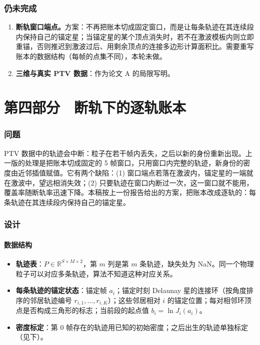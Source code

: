 \section{仍未完成}\label{pC:sec:rest}
\begin{enumerate}
\item \textbf{断轨窗口端点。}方案：不再把账本切成固定窗口，而是让每条轨迹在其连续段内保持自己的锚定星；当锚定星的某个顶点消失时，若不在激波模板内则立即重锚，否则推迟到激波过后、用剩余顶点的连接多边形计算面积比。需要重写账本的数据结构（每帧的点集不同），本轮未做。
\item \textbf{三维与真实 PTV 数据}：作为论文 A 的局限写明。
\end{enumerate}

\clearpage\part{第四部分　断轨下的逐轨账本}

\noindent{}



\section{问题}
PTV 数据中的轨迹会中断：粒子在若干帧内丢失，之后以新的身份重新出现。上一版的处理是把账本切成固定的 5 帧窗口，只用窗口内完整的轨迹，新身份的密度由近邻插值赋值。它有两个缺陷：(1) 窗口端点若落在激波内，锚定星的一端就在激波中，望远相消失效；(2) 只要轨迹在窗口内断过一次，这一窗口就不能用，覆盖率随断轨率迅速下降。本稿按上一份报告给出的方案，把账本改成逐轨的：每条轨迹在其连续段内保持自己的锚定星。

\section{设计}
\subsection{数据结构}
\begin{itemize}
\item \textbf{轨迹表}：$P\in\mathbb R^{S\times M\times2}$，第 $m$ 列是第 $m$ 条轨迹，缺失处为 NaN。同一个物理粒子可以对应多条轨迹，算法不知道这种对应关系。
\item \textbf{每条轨迹的锚定状态}：锚定帧 $a_i$；锚定时刻 Delaunay 星的连接环（按角度排序的邻居轨迹编号 $r_{i,1},\dots,r_{i,K}$）；这些邻居相对 $i$ 的锚定位置；每对相邻环顶点是否构成三角形的标志；当前段的起点值 $b_i=\ln J_i(a_i)$。
\item \textbf{密度标定}：第 0 帧存在的轨迹用已知的初始密度；之后出生的轨迹单独标定（见下）。
\end{itemize}

